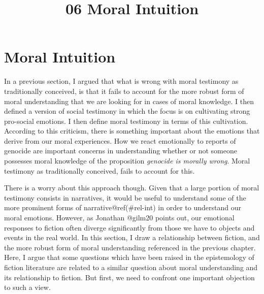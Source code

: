\documentclass[
  letterpaper,
  DIV=11,
  numbers=noendperiod]{scrartcl}
\title{06 Moral Intuition}
\author{}
\date{}
\theoremstyle{remark}
\begin{document}
\maketitle


\section{Moral Intuition}\label{moral-intuition}

In a previous section, I argued that what is wrong with moral testimony
as traditionally conceived, is that it fails to account for the more
robust form of moral understanding that we are looking for in cases of
moral knowledge. I then defined a version of social testimony in which
the focus is on cultivating strong pro-social emotions. I then define
moral testimony in terms of this cultivation. According to this
criticism, there is something important about the emotions that derive
from our moral experiences. How we react emotionally to reports of
genocide are important concerns in understanding whether or not someone
possesses moral knowledge of the proposition \emph{genocide is morally
wrong}. Moral testimony as traditionally conceived, fails to account for
this.

There is a worry about this approach though. Given that a large portion
of moral testimony consists in narratives, it would be useful to
understand some of the more prominent forms of narrative@ref(\#rel-int)
in order to understand our moral emotions. However, as Jonathan @gilm20
points out, our emotional responses to fiction often diverge
significantly from those we have to objects and events in the real
world. In this section, I draw a relationship between fiction, and the
more robust form of moral understanding referenced in the previous
chapter. Here, I argue that some questions which have been raised in the
epistemology of fiction literature are related to a similar question
about moral understanding and its relationship to fiction. But first, we
need to confront one important objection to such a view.
\end{document}
